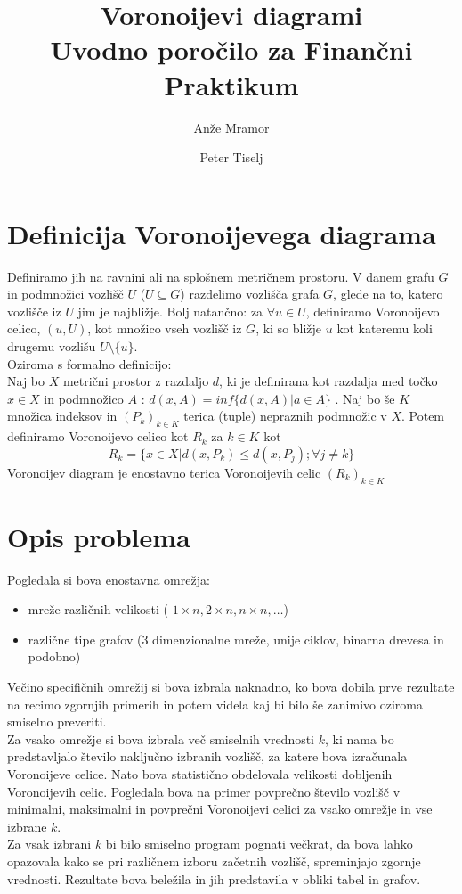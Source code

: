 \documentclass[a4paper, 12pt]{article}
\title{%
	Voronoijevi diagrami \\
	\large Uvodno poročilo za Finančni Praktikum}
\author{
	Anže Mramor\\
	\and
	Peter Tiselj}
\begin{document}
\setlength{\parindent}{0,5cm}

\maketitle


\section{Definicija Voronoijevega diagrama}
Definiramo jih na ravnini ali na splošnem metričnem prostoru. V danem grafu $G$ in podmnožici vozlišč $U$ ($U \subseteq G$) razdelimo vozlišča grafa $G$, glede na to, katero vozlišče iz $U$ jim je najbližje. Bolj natančno: za $\forall u \in U$, definiramo Voronoijevo celico, $(u, U)$, kot množico vseh vozlišč iz $G$, ki so bližje $u$ kot kateremu koli drugemu vozlišu $U \setminus \{u\}$.\\
Oziroma s formalno definicijo:\\
Naj bo $X$ metrični prostor z razdaljo $d$, ki je definirana kot razdalja med točko $x \in X$ in podmnožico $A$ : $d(x, A) = inf \{d(x, A) | a \in A \}$ . Naj bo še $K$ množica indeksov in $(P_k)_{k \in K}$ terica (tuple) nepraznih podmnožic v $X$. Potem definiramo Voronoijevo celico kot $R_k$ za $k \in K$ kot
$$ R_k = \{ x \in X | d(x,P_{k}) \leq d(x,P_{j}) ; \forall j \neq k \} $$
Voronoijev diagram je enostavno terica Voronoijevih celic $(R_k)_{k \in K}$

\section{Opis problema}
Pogledala si bova enostavna omrežja:
\begin{itemize}
\item mreže različnih velikosti ( $1 \times n, 2 \times n, n \times n, \dots $)
\item različne tipe grafov (3 dimenzionalne mreže, unije ciklov, binarna drevesa in podobno)
\end{itemize}
Večino specifičnih omrežij si bova izbrala naknadno, ko bova dobila prve rezultate na recimo zgornjih primerih in potem videla kaj bi bilo še zanimivo oziroma smiselno preveriti.\\
Za vsako omrežje si bova izbrala več smiselnih vrednosti $k$, ki nama bo predstavljalo število naključno izbranih vozlišč, za katere bova izračunala Voronoijeve celice. Nato bova statistično obdelovala velikosti dobljenih Voronoijevih celic. Pogledala bova na primer povprečno število vozlišč v minimalni, maksimalni in povprečni Voronoijevi celici za vsako omrežje in vse izbrane $k$.\\
Za vsak izbrani $k$ bi bilo smiselno program pognati večkrat, da bova lahko opazovala kako se pri različnem izboru začetnih vozlišč, spreminjajo zgornje vrednosti. Rezultate bova beležila in jih predstavila v obliki tabel in grafov.
\end{document}
